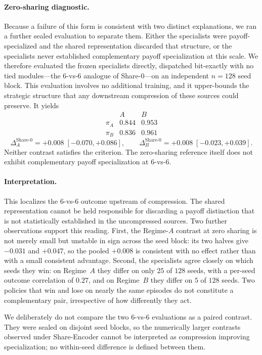 \paragraph{Zero-sharing diagnostic.}
Because a failure of this form is consistent with two distinct explanations,
we ran a further sealed evaluation to separate them. Either the specialists
were payoff-specialized and the shared representation discarded that structure,
or the specialists never established complementary payoff specialization at
this scale. We therefore evaluated the frozen specialists directly, dispatched
bit-exactly with no tied modules---the $6$-vs-$6$ analogue of Share-0---on an
independent $n=128$ seed block. This evaluation involves no additional
training, and it upper-bounds the strategic structure that any downstream
compression of these sources could preserve. It yields
\[
\begin{array}{c|cc}
 & A & B\\
\hline
\pi_A & 0.844 & 0.953\\
\pi_B & 0.836 & 0.961
\end{array}
\]
\[
    \Delta_A^{\text{Share-0}}=+0.008\;[-0.070,+0.086],
    \qquad
    \Delta_B^{\text{Share-0}}=+0.008\;[-0.023,+0.039].
\]
Neither contrast satisfies the criterion. The zero-sharing reference itself
does not exhibit complementary payoff specialization at $6$-vs-$6$.

\paragraph{Interpretation.}
This localizes the $6$-vs-$6$ outcome upstream of compression. The shared
representation cannot be held responsible for discarding a payoff distinction
that is not statistically established in the uncompressed sources. Two further
observations support this reading. First, the Regime-$A$ contrast at
zero sharing is not merely small but unstable in sign across the seed block:
its two halves give $-0.031$ and $+0.047$, so the pooled $+0.008$ is
consistent with no effect rather than with a small consistent advantage.
Second, the specialists agree closely on which seeds they win: on Regime~$A$
they differ on only $25$ of $128$ seeds, with a per-seed outcome correlation of
$0.27$, and on Regime~$B$ they differ on $5$ of $128$ seeds. Two policies that
win and lose on nearly the same episodes do not constitute a complementary pair,
irrespective of how differently they act.

We deliberately do not compare the two $6$-vs-$6$ evaluations as a paired
contrast. They were sealed on disjoint seed blocks, so the numerically larger
contrasts observed under Share-Encoder cannot be interpreted as compression
improving specialization; no within-seed difference is defined between them.

